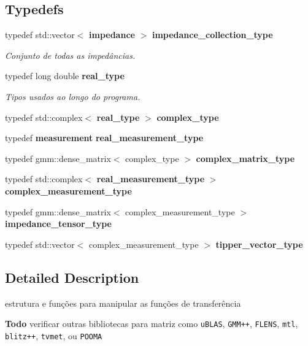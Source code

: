 \subsection*{Typedefs}
\begin{CompactItemize}
\item 
typedef std::vector$<$ {\bf impedance} $>$ {\bf impedance\_\-collection\_\-type}\label{namespacetransfer__function_3aa4c97b4bd003a53cbbda6a00e4c874}

\begin{CompactList}\small\item\em Conjunto de todas as impedâncias. \item\end{CompactList}\end{CompactItemize}
\begin{Indent}{\bf }\par
\begin{CompactItemize}
\item 
typedef long double {\bf real\_\-type}\label{namespacetransfer__function_b575649c8d454717b5a1aeec7e231e14}

\begin{CompactList}\small\item\em Tipos usados ao longo do programa. \item\end{CompactList}\item 
typedef std::complex$<$ {\bf real\_\-type} $>$ \textbf{complex\_\-type}\label{namespacetransfer__function_11d3acccf7dfefb6c001dbb6d268028a}

\item 
typedef {\bf measurement} \textbf{real\_\-measurement\_\-type}\label{namespacetransfer__function_a70d69c285be6b23daf2ad83cd512299}

\item 
typedef gmm::dense\_\-matrix$<$ complex\_\-type $>$ \textbf{complex\_\-matrix\_\-type}\label{namespacetransfer__function_d5319353931fcfc65612240a87e612da}

\item 
typedef std::complex$<$ {\bf real\_\-measurement\_\-type} $>$ \textbf{complex\_\-measurement\_\-type}\label{namespacetransfer__function_9db12f13ccf227796862b2ca4b059ed3}

\item 
typedef gmm::dense\_\-matrix$<$ complex\_\-measurement\_\-type $>$ \textbf{impedance\_\-tensor\_\-type}\label{namespacetransfer__function_2be30494eea5be90e98ac8ae4a47dae6}

\item 
typedef std::vector$<$ complex\_\-measurement\_\-type $>$ \textbf{tipper\_\-vector\_\-type}\label{namespacetransfer__function_f5dfc9bc91c421ee73e2d760876cea40}

\end{CompactItemize}
\end{Indent}


\subsection{Detailed Description}
estrutura e funções para manipular as funções de transferência 

\begin{Desc}
\item[{\bf Todo}]verificar outras bibliotecas para matriz como {\tt uBLAS}, {\tt GMM++}, {\tt FLENS}, {\tt mtl}, {\tt blitz++}, {\tt tvmet}, ou {\tt POOMA} \end{Desc}
